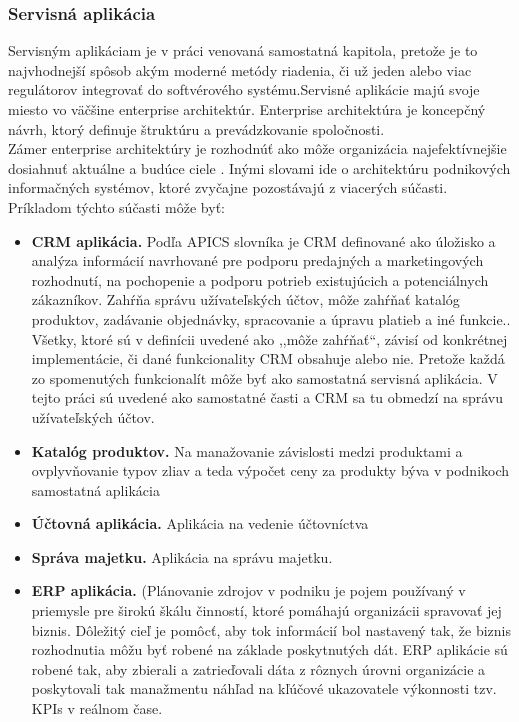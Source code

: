 \subsubsection{Servisná aplikácia}
Servisným aplikáciam je v práci venovaná samostatná kapitola, pretože je to najvhodnejší spôsob akým moderné metódy riadenia, či už jeden alebo viac regulátorov integrovať do softvérového systému.Servisné aplikácie majú svoje miesto vo väčšine enterprise architektúr.  Enterprise architektúra je koncepčný návrh, ktorý definuje štruktúru a prevádzkovanie spoločnosti.\\ 
Zámer enterprise architektúry je rozhodnúť ako môže organizácia najefektívnejšie dosiahnuť aktuálne a budúce ciele \cite{IOT09}. Inými slovami ide o  architektúru podnikových informačných systémov, ktoré zvyčajne pozostávajú z viacerých súčasti. Príkladom týchto súčasti môže byť:
\begin{itemize}
  \item  \textbf{CRM aplikácia.} Podľa APICS slovníka \cite{IOT10} je CRM definované ako úložisko a analýza informácií navrhované pre podporu predajných a marketingových rozhodnutí, na pochopenie a podporu potrieb existujúcich a potenciálnych zákazníkov. Zahŕňa správu užívateľských účtov, môže zahŕňať katalóg produktov, zadávanie objednávky, spracovanie a úpravu platieb a iné funkcie.\cite{IOT11}. Všetky, ktoré sú v definícii uvedené ako ,,môže zahŕňať``, závisí od konkrétnej implementácie, či dané funkcionality CRM obsahuje alebo nie. Pretože každá zo spomenutých funkcionalít môže byť ako samostatná servisná aplikácia. V tejto práci sú uvedené ako samostatné časti a CRM sa tu obmedzí na správu užívateľských účtov.
  \item  \textbf{Katalóg produktov.} Na manažovanie závislosti medzi produktami a ovplyvňovanie typov zliav a teda výpočet ceny za produkty býva v podnikoch samostatná aplikácia
 \item  \textbf{Účtovná aplikácia.} Aplikácia na vedenie účtovníctva
 \item  \textbf{Správa majetku.} Aplikácia na správu majetku. 
  \item  \textbf{ERP aplikácia.} (Plánovanie zdrojov v podniku je pojem používaný v priemysle pre širokú škálu činností, ktoré pomáhajú organizácii spravovať jej biznis. Dôležitý cieľ je pomôcť, aby tok informácií bol nastavený tak, že biznis rozhodnutia môžu byť robené na základe poskytnutých dát. ERP aplikácie sú robené tak, aby zbierali a zatrieďovali dáta z rôznych úrovni organizácie a poskytovali tak manažmentu náhľad na kľúčové ukazovatele výkonnosti tzv. KPIs v reálnom čase.\cite{IOT12} 
\end{itemize} 
